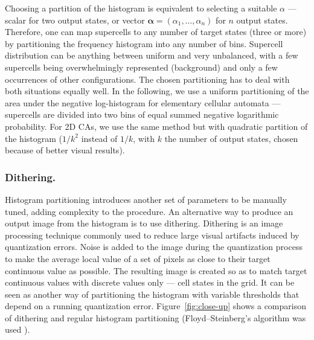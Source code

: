 Choosing a partition of the histogram is equivalent to selecting a suitable
$\alpha$ --- scalar for two output states, or vector $\mathbf{\alpha} =
(\alpha_1, \ldots, \alpha_n)$ for $n$ output states. Therefore, one can map
supercells to any number of target states (three or more) by partitioning the
frequency histogram into any number of bins. Supercell distribution can be
anything between uniform and very unbalanced, with a few supercells being
overwhelmingly represented (background) and only a few occurrences of other
configurations. The chosen partitioning has to deal with both situations equally
well. In the following, we use a uniform partitioning of the area under the
negative log-histogram for elementary cellular automata --- supercells are
divided into two bins of equal summed negative logarithmic probability. For 2D
CAs, we use the same method but with quadratic partition of the histogram
($1/k^2$ instead of $1/k$, with $k$ the number of output states, chosen because
of better visual results).

\subsubsection{Dithering.}\label{sec:dithering}
Histogram partitioning introduces another set of parameters to be manually
tuned, adding complexity to the procedure. An alternative way to produce an
output image from the histogram is to use dithering. Dithering is an image
processing technique commonly used to reduce large visual artifacts induced by
quantization errors. Noise is added to the image during the quantization process
to make the average local value of a set of pixels as close to their target
continuous value as possible. The resulting image is created so as to match
target continuous values with discrete values only --- cell states in the grid.
It can be seen as another way of partitioning the histogram with variable
thresholds that depend on a running quantization error.
Figure~\ref{fig:close-up} shows a comparison of dithering and regular histogram
partitioning (Floyd–Steinberg's algorithm was used
\cite{floydAdaptiveAlgorithmSpatial1976}).

